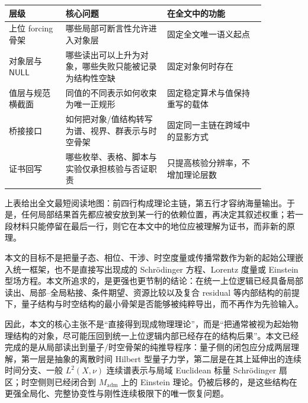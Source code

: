 \begin{center}
\begin{tabular}{>{\raggedright\arraybackslash}p{0.19\linewidth} >{\raggedright\arraybackslash}p{0.34\linewidth} >{\raggedright\arraybackslash}p{0.33\linewidth}}
\toprule
层级 & 核心问题 & 在全文中的功能 \\
\midrule
上位 forcing 骨架 & 哪些局部可断言性允许进入对象层 & 固定全文唯一语义起点 \\
对象层与 \(\mathsf{NULL}\) & 哪些读出可以上升为对象，哪些失败只能被记录为结构性空缺 & 固定对象何时存在 \\
值层与规范横截面 & 同值的不同表示如何收束为唯一正规形 & 固定稳定算术与值保持重写的载体 \\
桥接接口 & 如何把对象/值结构转写为谱、视界、群表示与时空骨架 & 固定同一主链在跨域中的显影方式 \\
证书回写 & 哪些枚举、表格、脚本与实验仅承担核验与否证职责 & 只提高核验分辨率，不增加理论层数 \\
\bottomrule
\end{tabular}
\end{center}
\par
上表给出全文最短阅读地图：前四行构成理论主链，第五行才容纳海量输出。于是，任何局部结果首先都应被安放到某一行的依赖位置，再决定其叙述权重；若一段材料只能停留在最后一行，则它在本文中的地位应被理解为证书，而非新的原理。
\par
本文的目标不是把量子态、相位、干涉、时空度量或传播常数作为新的起始公理嵌入统一框架，也不是直接写出现成的 Schr\"odinger 方程、Lorentz 度量或 Einstein 型场方程。本文所追求的，是更强也更节制的结论：在统一上位逻辑已经具备局部读出、局部--全局粘接、条件期望、资源比较以及复合 residual 等内部结构的前提下，量子结构与时空结构的最小骨架是否能够被纯粹导出，而不再作为先验输入。
\par
因此，本文的核心主张不是“直接得到现成物理理论”，而是“把通常被视为起始物理结构的对象，尽可能压回到统一上位逻辑内部已经存在的结构后果”。本文已经完成的是从局部读出到量子/时空骨架的纯推导程序：量子侧的闭包应分成两层理解，第一层是抽象的离散时间 Hilbert 型量子力学，第二层是在其上延伸出的连续时间分支、一般 \(L^2(X,\nu)\) 连续谱表示与局域 Euclidean 标量 Schr\"odinger 扇区；时空侧则已经闭合到 \(M_{\mathrm{adm}}\) 上的 Einstein 理论。仍被后移的，是这些结构在更强全局化、完整协变性与刚性连续极限下的唯一恢复问题。
